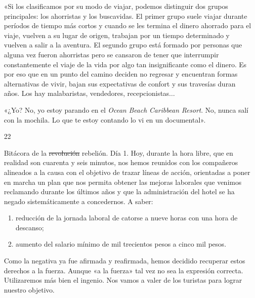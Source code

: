 \documentclass[12pt,twoside,openright,a5paper]{book}
\begin{document}
«Si los clasificamos por su modo de viajar, podemos distinguir dos grupos
principales: los ahorristas y los buscavidas. El primer grupo suele viajar
durante períodos de tiempo más cortos y cuando se les termina el dinero
ahorrado para el viaje, vuelven a su lugar de origen, trabajan por un
tiempo determinado y vuelven a salir a la aventura. El segundo grupo está
formado por personas que alguna vez fueron ahorristas pero se cansaron
de tener que interrumpir constantemente el viaje de la vida por algo tan
insignificante como el dinero. Es por eso que en un punto del camino
deciden no regresar y encuentran formas alternativas de vivir, bajan sus
expectativas de confort y sus travesías duran años. Los hay malabaristas,
vendedores, recepcionistas...

«¿Yo? No, yo estoy parando en el \emph{Ocean Beach Caribbean Resort}. No, nunca
salí con la mochila. Lo que te estoy contando lo vi en un documental».

\vspace{0.5cm}
\afterpage{}
\hrulefill \hspace{0.1cm}\decofourleft\hspace{0.2cm} 22 \hspace{0.2cm}\decofourright \hspace{0.1cm}\hrulefill

\nopagebreak

\vspace{0.5cm}

\nopagebreak

Bitácora de la \st{revolución} rebelión. Día 1. Hoy, durante la hora libre, que en
realidad son cuarenta y seis minutos, nos hemos reunidos con los compañeros alineados
a la causa con el objetivo de trazar líneas de acción, orientadas a poner
en marcha un plan que nos permita obtener las mejoras laborales que venimos
reclamando durante los últimos años y que la administración del hotel
se ha negado sistemáticamente a concedernos. A saber:

\begin{enumerate}
\item reducción de la jornada laboral de catorse a nueve horas con una hora de descanso;
\item aumento del salario mínimo de mil trecientos pesos a cinco mil pesos.
\end{enumerate}

Como la negativa ya fue afirmada y reafirmada, hemos decidido recuperar
estos derechos a la fuerza. Aunque «a la fuerza» tal vez no sea la expresión
correcta. Utilizaremos más bien el ingenio. Nos vamos a valer de los turistas
para lograr nuestro objetivo.
\end{document}
